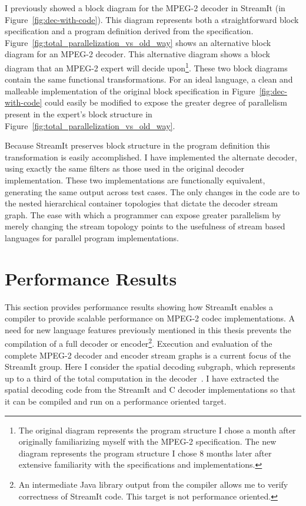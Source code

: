 I previously showed a block diagram for the MPEG-2 decoder 
in StreamIt (in Figure~\ref{fig:dec-with-code}). This diagram 
represents both a straightforward block specification and a program 
definition derived from the specification.  
Figure~\ref{fig:total_parallelization_vs_old_way} shows 
an alternative block diagram for an MPEG-2 decoder. This 
alternative diagram shows a block diagram that an MPEG-2 expert will decide 
upon\footnote{The original diagram represents the program structure 
I chose a month after originally familiarizing myself with the 
MPEG-2 specification. The new diagram represents the program 
structure I chose 8 months later after extensive familiarity 
with the specifications and implementations.}. These two block 
diagrams contain the same functional transformations. For an 
ideal language, a clean and malleable implementation of the 
original block specification in Figure~\ref{fig:dec-with-code} 
could easily be modified to expose the greater degree of 
parallelism present in the expert's block structure in 
Figure~\ref{fig:total_parallelization_vs_old_way}.

Because StreamIt preserves block structure in the program 
definition this transformation is easily accomplished. I have 
implemented the alternate decoder, using exactly the same 
filters as those used in the original decoder implementation. 
These two implementations are functionally equivalent, 
generating the same output across test cases. The only 
changes in the code are to the nested hierarchical container 
topologies that dictate the decoder stream graph. The ease 
with which a programmer can expose greater parallelism by 
merely changing the stream topology points to the 
usefulness of stream based languages for parallel program 
implementations.

\section{Performance Results}

This section provides performance results showing how StreamIt 
enables a compiler to provide scalable performance on MPEG-2 
codec implementations. A need for new language features previously 
mentioned in this thesis prevents the compilation of a full 
decoder or encoder\footnote{An intermediate Java library output 
from the compiler allows me to verify correctness of StreamIt code. This target is 
not performance oriented.}. 
Execution and evaluation of the complete MPEG-2 decoder and encoder stream graphs 
is a current focus of the StreamIt group.
Here I consider the spatial decoding subgraph, 
which represents up to a third of the total computation
in the decoder~\cite{iwata98coarse}.
I have extracted the 
spatial decoding code from the StreamIt and C decoder implementations
so that it can be compiled and run on a performance oriented target.

